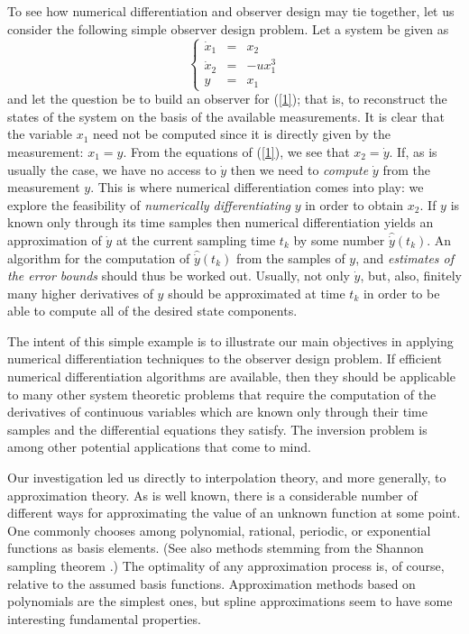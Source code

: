 To see how numerical differentiation and observer design may tie together, 
let us consider the 
following simple observer design problem.
Let a system be given as
\begin{equation}
\left\{
\begin{array}{rcl}
\dot x_1 & = & x_2\\
\dot x_2 & = & -ux_1^3\\
y & = & x_1\end{array}
\right. \label{1}
\end{equation}
and let the question be to build an observer for (\ref{1}); that is,
to reconstruct the states of the system on the basis of the available
measurements.
It is clear that the variable $x_1$ need not be computed since it 
is directly given by the measurement: $ x_1 = y$.
From the equations of (\ref{1}), we see that $x_2 = \dot y$.
If, as is usually the case, we have no access to 
$\dot y$ then we need to {\it compute} $\dot y$ from the measurement $y$.
This is where numerical differentiation comes into play:
we explore the feasibility of {\it numerically
differentiating} $y$ in order to obtain $x_2$.
If $y$ is known only through its time samples then numerical 
differentiation yields an approximation of
$\dot y$ at the current sampling time $t_k$ by some number
$\hat {\dot y}(t_k)$.
An algorithm for the computation of $\hat {\dot y}(t_k)$ from the
samples of $y$, and {\it estimates of the error bounds} should thus be worked out.
Usually, not only $\dot y$, but, also, finitely many higher
derivatives of $y$ should be approximated at time $t_k$ in order to be
able to compute all of the desired state components.

The intent of this simple example is to 
illustrate our main objectives in applying 
numerical differentiation techniques to the observer design problem.
If efficient numerical 
differentiation algorithms are available, then they should be
applicable to many other system theoretic problems that require the
computation of the derivatives of continuous variables which are
known only through their time samples and the differential equations they
satisfy.
The inversion problem is among other potential applications that come to mind.

Our investigation led us directly to interpolation theory, and more
generally, to approximation theory.
As is well known, there is a considerable number of different ways for
approximating the value of an unknown function at some point.
One commonly chooses among polynomial, rational, periodic, or exponential
functions
as basis elements.
(See also methods stemming from the Shannon sampling theorem
\cite{butzer1971,butzer1977,splettstosser1979,splettstosser1983,butzer1983a,butzer1983b,ries1983,schussler1983}.)
The optimality of any approximation process is, of course, relative to the
assumed basis functions.
Approximation methods based on polynomials are the
simplest ones, but spline approximations seem to have some interesting
fundamental properties.


